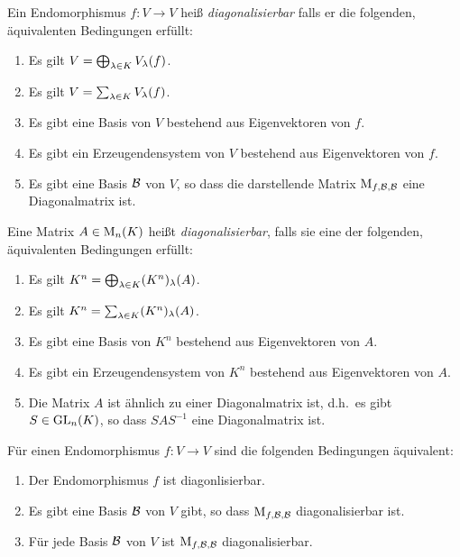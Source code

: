 \begin{definition}
  Ein Endomorphismus $f \colon V \to V$ heiß \emph{diagonalisierbar} falls er die folgenden, äquivalenten Bedingungen erfüllt:
  \begin{enumerate}[label = \arabic*.]
    \item
      Es gilt $V = \bigoplus_{\lambda \in K} V_{\lambda}(f)$.
    \item
      Es gilt $V = \sum_{\lambda \in K} V_{\lambda}(f)$.
    \item
      Es gibt eine Basis von $V$ bestehend aus Eigenvektoren von $f$.
    \item
      Es gibt ein Erzeugendensystem von $V$ bestehend aus Eigenvektoren von $f$.
    \item
      Es gibt eine Basis $\mathcal{B}$ von $V$, so dass die darstellende Matrix $\operatorname{M}_{f, \mathcal{B}, \mathcal{B}}$ eine Diagonalmatrix ist.
  \end{enumerate}
  Eine Matrix $A \in \operatorname{M}_{n}(K)$ heißt \emph{diagonalisierbar}, falls sie eine der folgenden, äquivalenten Bedingungen erfüllt:
  \begin{enumerate}[label = \arabic*.]
    \item
      Es gilt $K^n = \bigoplus_{\lambda \in K} (K^n)_{\lambda}(A)$.
    \item
      Es gilt $K^n = \sum_{\lambda \in K} (K^n)_{\lambda}(A)$.
    \item
      Es gibt eine Basis von $K^n$ bestehend aus Eigenvektoren von $A$.
    \item
      Es gibt ein Erzeugendensystem von $K^n$ bestehend aus Eigenvektoren von $A$.
    \item
      Die Matrix $A$ ist ähnlich zu einer Diagonalmatrix ist, d.h.\ es gibt $S \in \operatorname{GL}_{n}(K)$, so dass $S A S^{-1}$ eine Diagonalmatrix ist.
  \end{enumerate}
\end{definition}

\begin{lemma}
  Für einen Endomorphismus $f \colon V \to V$ sind die folgenden Bedingungen äquivalent:
  \begin{enumerate}
    \item
      Der Endomorphismus $f$ ist diagonlisierbar.
    \item
      Es gibt eine Basis $\mathcal{B}$ von $V$ gibt, so dass $\operatorname{M}_{f, \mathcal{B}, \mathcal{B}}$ diagonalisierbar ist.
    \item
      Für jede Basis $\mathcal{B}$ von $V$ ist $\operatorname{M}_{f, \mathcal{B}, \mathcal{B}}$ diagonalisierbar.
  \end{enumerate}
\end{lemma}

